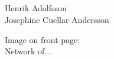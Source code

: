 
\noindent
\thesistitle \\
\thesissubtitle \\
\whatthisis \\
\\
\large{%
    Henrik Adolfsson\\
	Josephine Cuellar Andersson\\
}

\vspace*{\fill}
\noindent
Image on front page:\\
Network of...

\thispagestyle{empty}
\newpage
